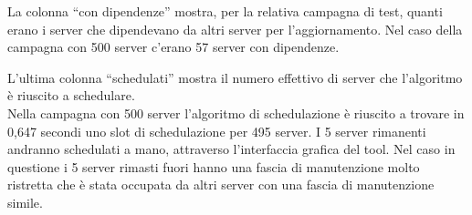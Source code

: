 La colonna “con dipendenze” mostra, per la relativa campagna di test, quanti 
erano i server che dipendevano da altri server per l’aggiornamento. Nel caso 
della campagna con 500 server c’erano 57 server con dipendenze.

L’ultima colonna “schedulati” mostra il numero effettivo di server che 
l’algoritmo è riuscito a schedulare.\\

Nella campagna con 500 server 
l’algoritmo di schedulazione è riuscito a trovare in 0,647 secondi uno slot 
di schedulazione per 495 server. I 5 server rimanenti andranno schedulati a 
mano, attraverso l’interfaccia grafica del tool. Nel caso in questione i 5 server 
rimasti fuori hanno una fascia di manutenzione molto ristretta che è stata 
occupata da altri server con una fascia di manutenzione simile.
